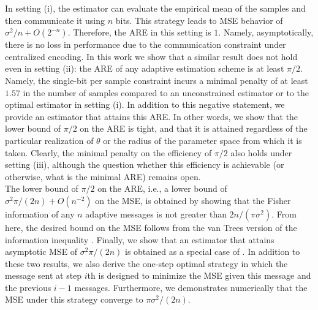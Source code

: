 \documentclass[letterpaper, conference,9pt]{IEEEtran}      %
\begin{document}
In setting (i), the estimator can evaluate the empirical mean of the samples and then communicate it using $n$ bits. This strategy leads to MSE behavior of $\sigma^2/n + O(2^{-n})$. Therefore, the ARE in this setting is $1$. Namely, asymptotically, there is no loss in performance due to the communication constraint under centralized encoding. In this work we show that a similar result does not hold even in setting (ii): the ARE of any adaptive estimation scheme is at least $\pi/2$. Namely, the single-bit per sample constraint incurs a minimal penalty of at least $1.57$ in the number of samples compared to an unconstrained estimator or to the optimal estimator in setting (i). In addition to this negative statement, we provide an estimator that attains this ARE. In other words, we show that the lower bound of $\pi/2$ on the ARE is tight, and that it is attained regardless of the particular realization of $\theta$ or the radius of the parameter space from which it is taken. Clearly, the minimal penalty on the efficiency of $\pi/2$ also holds under setting (iii), although the question whether this efficiency is achievable (or otherwise, what is the minimal ARE) remains open. 
\\

The lower bound of $\pi/2$ on the ARE, i.e., a lower bound of $\sigma^2\pi/(2n) +O(n^{-2})$ on the MSE, is obtained by showing that the Fisher information of any $n$ adaptive messages is not greater than $2n/(\pi \sigma^2)$. From here, the desired bound on the MSE follows from the van Trees version of the information inequality \cite{gill1995applications}. Finally, we show that an estimator that attains asymptotic MSE of $\sigma^2\pi/(2n)$ is obtained as a special case of \cite[Thm. 4]{polyak1992acceleration}. In addition to these two results, we also derive the one-step optimal strategy in which the message sent at step $i$th is designed to minimize the MSE given this message and the previous $i-1$ messages. Furthermore, we demonstrates numerically that the MSE under this strategy converge to $\pi \sigma^2/(2n)$.\\
\end{document}
